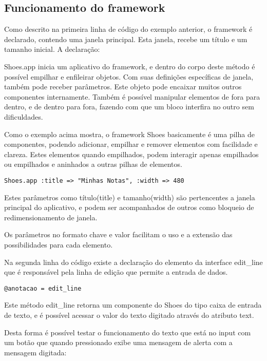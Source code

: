 \documentclass[12pt]{article}
\begin{document}
\subsection { Funcionamento do framework }

Como descrito na primeira linha de código do exemplo anterior, o framework é declarado, contendo uma janela principal. Esta janela, recebe um título e um tamanho inicial.
A declaração:

 

Shoes.app inicia um aplicativo do framework, e dentro do corpo deste método é possível empilhar e enfileirar objetos. Com suas definições específicas de janela, também pode receber parâmetros. Este objeto pode encaixar muitos outros componentes internamente. Também é possível manipular elementos de fora para dentro, e de dentro para fora, fazendo com que um bloco interfira no outro sem dificuldades.

Como o exemplo acima mostra, o framework Shoes basicamente é uma pilha de componentes, podendo adicionar, empilhar e remover elementos com facilidade e clareza. Estes elementos quando empilhados, podem interagir apenas empilhados ou empilhados e aninhados a outras pilhas de elementos. 


\begin{lstlisting}[caption=Primeira explicação do framework Shoes  ]
Shoes.app :title => "Minhas Notas", :width => 480
\end{lstlisting}

Estes parâmetros como título(title) e tamanho(width) são pertencentes a janela principal do aplicativo, e podem ser acompanhados de outros como bloqueio de redimensionamento de janela.

Os parâmetros no formato chave e valor facilitam o uso e a extensão das possibilidades para cada elemento.

Na segunda linha do código existe a declaração do elemento da interface edit\_line que é responsável pela linha de edição que permite a entrada de dados. 

\begin{lstlisting}[caption=Entendendo a linha de edição]
@anotacao = edit_line
\end{lstlisting}

Este método edit\_line retorna um componente do Shoes do tipo caixa de entrada de texto, e é possível acessar o valor do texto digitado através do atributo text. 

Desta forma é possível testar o funcionamento do texto que está no input com um botão que quando pressionado exibe uma mensagem de alerta com a mensagem digitada:
\end{document}
